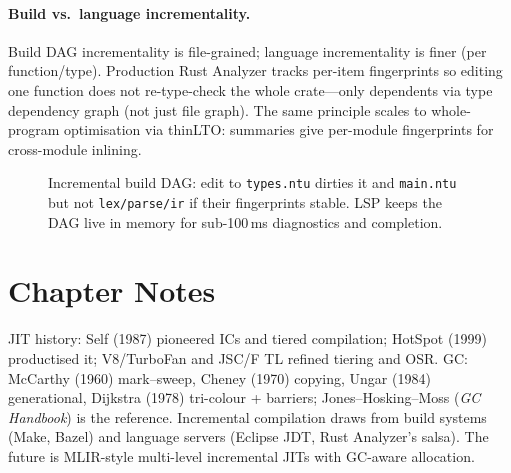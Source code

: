 \paragraph{Build vs.\ language incrementality.}
Build DAG incrementality is file-grained; language incrementality is finer (per function/type). Production Rust Analyzer tracks per-item fingerprints so editing one function does not re-type-check the whole crate---only dependents via type dependency graph (not just file graph). The same principle scales to whole-program optimisation via thinLTO: summaries give per-module fingerprints for cross-module inlining.

\begin{figure}[h]
\centering
{}
\caption{Incremental build DAG: edit to \texttt{types.ntu} dirties it and \texttt{main.ntu} but not \texttt{lex/parse/ir} if their fingerprints stable. LSP keeps the DAG live in memory for sub-100\,ms diagnostics and completion.}
\label{fig:incremental-dag}
\end{figure}

\section{Chapter Notes}
JIT history: Self (1987) pioneered ICs and tiered compilation; HotSpot (1999) productised it; V8/TurboFan and JSC/F TL refined tiering and OSR. GC: McCarthy (1960) mark--sweep, Cheney (1970) copying, Ungar (1984) generational, Dijkstra (1978) tri-colour + barriers; Jones--Hosking--Moss (\emph{GC Handbook}) is the reference. Incremental compilation draws from build systems (Make, Bazel) and language servers (Eclipse JDT, Rust Analyzer's salsa). The future is MLIR-style multi-level incremental JITs with GC-aware allocation.

